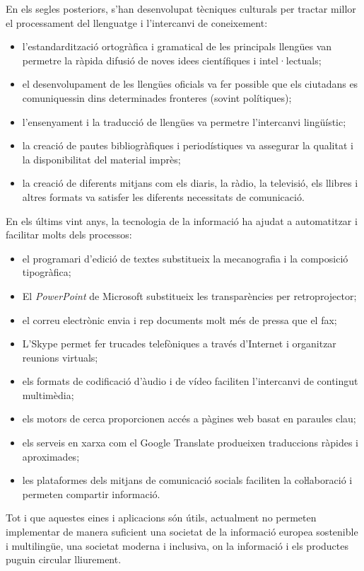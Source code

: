 \documentclass[]{../../metanetpaper}
\begin{document}
\begin{multicols}{2}
En els segles posteriors, s’han desenvolupat tècniques culturals per tractar millor el processament del llenguatge i l’intercanvi de coneixement: 
\begin{itemize}
\item l’estandardització ortogràfica i gramatical de les principals llengües van permetre la ràpida difusió de noves idees científiques i intel·lectuals;
\item el desenvolupament de les llengües oficials va fer possible que els ciutadans es comuniquessin dins determinades fronteres (sovint polítiques);
\item l’ensenyament i la traducció de llengües va permetre l’intercanvi lingüístic;
\item la creació de pautes bibliogràfiques i periodístiques va assegurar la qualitat i la disponibilitat del material imprès;
\item la creació de diferents mitjans com els diaris, la ràdio, la televisió, els llibres i altres formats va satisfer les diferents necessitats de comunicació. 
\end{itemize}
En els últims vint anys, la tecnologia de la informació ha ajudat a automatitzar i facilitar molts dels processos:
\begin{itemize}
\item el programari d’edició de textes substitueix la mecanografia i la composició tipogràfica;
\item El \textit{PowerPoint} de Microsoft substitueix les transparències per retroprojector;
\item el correu electrònic envia i rep documents molt més de pressa que el fax;
\item L’Skype permet fer trucades telefòniques a través d’Internet i organitzar reunions virtuals;
\item els formats de codificació d’àudio i de vídeo faciliten l’intercanvi de contingut multimèdia;
\item els motors de cerca proporcionen accés a pàgines web basat en paraules clau;
\item els serveis en xarxa com el Google Translate produeixen traduccions ràpides i aproximades;
\item les plataformes dels mitjans de comunicació socials faciliten la coŀlaboració i permeten compartir informació.
\end{itemize}
Tot i que aquestes eines i aplicacions són útils, actualment no permeten implementar de manera suficient una societat de la informació europea sostenible i multilingüe, una societat moderna i inclusiva, on la informació i els productes puguin circular lliurement.


\end{multicols}
\end{document}
